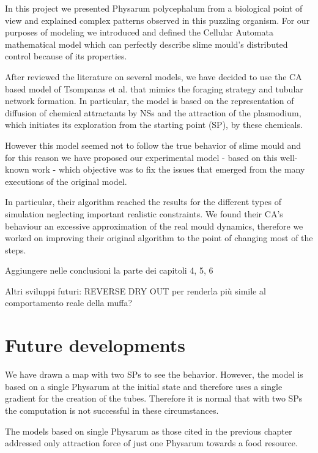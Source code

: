 In this project we presented Physarum polycephalum from a biological point of view and explained complex patterns observed in this puzzling organism. For our purposes of modeling we introduced and defined the Cellular Automata mathematical model  which can perfectly describe slime mould's distributed control because of its properties.

\par
After reviewed the literature on several models, we have decided to use the CA based model of Tsompanas et al. \cite{Tsompanas2016} that mimics the foraging strategy and tubular network formation. In particular, the model is based on the representation of diffusion of chemical attractants by NSs and the attraction of the plasmodium, which initiates its exploration from the starting point (SP), by these chemicals. 

\par
However this model seemed not to follow the true behavior of slime mould and for this reason we have proposed our experimental model - based on this well-known work - which objective was to fix the issues that emerged from the many executions of the original model.

\par
In particular, their algorithm reached the results for the different types of simulation neglecting important realistic constraints. We found their CA's behaviour an excessive approximation of the real mould dynamics, therefore we worked on improving their original algorithm to the point of changing most of the steps.

Aggiungere nelle conclusioni la parte dei capitoli 4, 5, 6

Altri sviluppi futuri: REVERSE DRY OUT per renderla più simile al comportamento reale della muffa?

\section{Future developments}
We have drawn a map with two SPs to see the behavior. However, the model is based on a single Physarum at the initial state and therefore uses a single gradient for the creation of the tubes. Therefore it is normal that with two SPs the computation is not successful in these circumstances.

\par
The models based on single Physarum as those cited in the previous chapter addressed only attraction force of just one Physarum towards a food resource.

